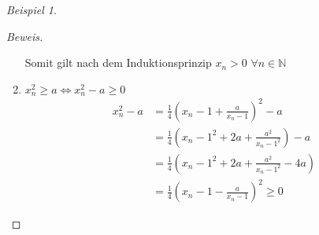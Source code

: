 \documentclass[12pt,a4paper,titlepage]{article} %
\theoremstyle{definition}
\theoremstyle{remark}
\newtheorem*{bsp}{Beispiel}
\newenvironment{bew}{\begin{proof}[Beweis]}{\end{proof}}
\newcommand{\N}{\mathbb{N}}
\begin{document}
\begin{bsp}
\begin{bew}
\begin{enumerate}
					Somit gilt nach dem Induktionsprinzip \(x_n > 0\) \(\forall n \in \N\)
				\item 
					\(x_n^2 \geq a \Leftrightarrow x_n^2 - a \geq 0 \)
					\begin{align*}
						x_n^2 - a &= \frac{1}{4}\left(x_n-1 + \frac{a}{x_n-1}\right)^2 - a\\
						&= \frac{1}{4}\left(x_n-1^2 + 2a + \frac{a^2}{x_n-1^2}\right) - a\\
						&= \frac{1}{4}\left(x_n-1^2 + 2a + \frac{a^2}{x_n-1^2} - 4a\right)\\
						&= \frac{1}{4}\left(x_n-1 - \frac{a}{x_n-1}\right)^2 \geq 0
					\end{align*}
			\end{enumerate}
		\end{bew}
	\end{bsp}
\end{document}
